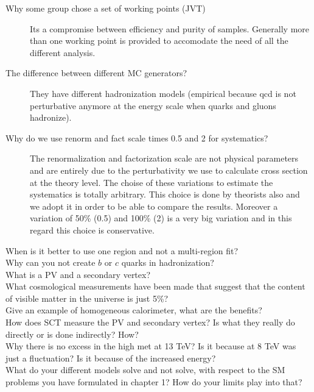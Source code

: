 \documentclass[a4paper,10pt,twoside,notitlepage]{article}
\begin{document}
\begin{description}
\item[Why some group chose a set of working points (JVT)] Its a compromise
  between efficiency and purity of samples. Generally more than one working
  point is provided to accomodate the need of all the different analysis.

\item[The difference between different MC generators?] They have different
  hadronization models (empirical because qcd is not perturbative anymore at the
  energy scale when quarks and gluons hadronize).

\item[Why do we use renorm and fact scale times 0.5 and 2 for systematics?] The
  renormalization and factorization scale are not physical parameters and are
  entirely due to the perturbativity we use to calculate cross section at the
  theory level. The choise of these variations to estimate the systematics is
  totally arbitrary. This choice is done by theorists also and we adopt it in
  order to be able to compare the results. Moreover a variation of 50\% (0.5)
  and 100\% (2) is a very big variation and in this regard this choice is
  conservative.

\item[When is it better to use one region and not a multi-region fit?]

\item[Why can you not create $b$ or $c$ quarks in hadronization?]

\item[What is a PV and a secondary vertex?]

\item[What cosmological measurements have been made that suggest that the
  content of visible matter in the universe is just 5\%?]

\item[Give an example of homogeneous calorimeter, what are the benefits?]

\item[How does SCT measure the PV and secondary vertex? Is what they really do
  directly or is done indirectly? How?]

\item[Why there is no excess in the high met at 13 TeV? Is it because at 8 TeV
  was just a fluctuation? Is it because of the increased energy?]

\item[What do your different models solve and not solve, with respect to the SM
  problems you have formulated in chapter 1? How do your limits play into that?]


\end{description}
\end{document}
